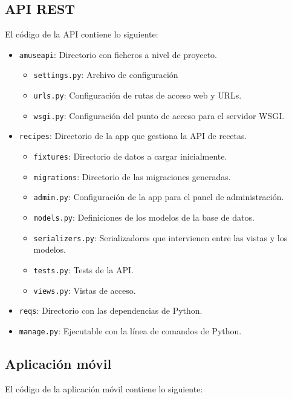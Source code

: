 \subsection{API REST}

El código de la API contiene lo siguiente:
\begin{itemize}
\item \texttt{amuseapi}: Directorio con ficheros a nivel de proyecto.
  \begin{itemize}
  \item \texttt{settings.py}: Archivo de configuración
  \item \texttt{urls.py}: Configuración de rutas de acceso web y URLs.
  \item \texttt{wsgi.py}: Configuración del punto de acceso para el servidor
    WSGI.
  \end{itemize}
\item \texttt{recipes}: Directorio de la app que gestiona la API de recetas.
  \begin{itemize}
  \item \texttt{fixtures}: Directorio de datos a cargar inicialmente.
  \item \texttt{migrations}: Directorio de las migraciones generadas.
  \item \texttt{admin.py}: Configuración de la app para el panel de
    administración.
  \item \texttt{models.py}: Definiciones de los modelos de la base de datos.
  \item \texttt{serializers.py}: Serializadores que intervienen entre las vistas
    y los modelos.
  \item \texttt{tests.py}: Tests de la API.
  \item \texttt{views.py}: Vistas de acceso.
  \end{itemize}
\item \texttt{reqs}: Directorio con las dependencias de Python.
\item \texttt{manage.py}: Ejecutable con la línea de comandos de Python.
\end{itemize}

\subsection{Aplicación móvil}

El código de la aplicación móvil contiene lo siguiente:

